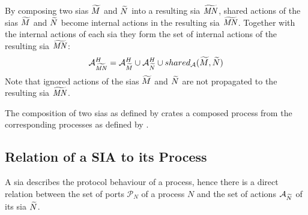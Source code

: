 By composing two \glspl{sia} $\widetilde{M}$ and $\widetilde{N}$ into a resulting \gls{sia} $\widetilde{\mathit{MN}}$, shared actions of the \glspl{sia} $\widetilde{M}$ and $\widetilde{N}$ become internal actions in the resulting \gls{sia} $\widetilde{\mathit{MN}}$.
Together with the internal actions of each \gls{sia} they form the set of internal actions of the resulting \gls{sia} $\widetilde{\mathit{MN}}$:
\begin{displaymath}
    \mathcal{A}_{\widetilde{\mathit{MN}}}^H = \mathcal{A}_{\widetilde{M}}^H \cup \mathcal{A}_{\widetilde{N}}^H \cup shared_\mathcal{A}(\widetilde{M},\widetilde{N})
\end{displaymath}
Note that ignored actions of the \glspl{sia} $\widetilde{M}$ and $\widetilde{N}$ are not propagated to the resulting \gls{sia} $\widetilde{\mathit{MN}}$.

The composition of two \glspl{sia} as defined by \Def{\ref{def_sia_comp}} crates a composed process from the corresponding processes as defined by \Def{\ref{def_proc_composed}}.

\subsection{Relation of a SIA to its Process}
\label{sect_sia_proc}
A \gls{sia} describes the protocol behaviour of a process, hence there is a direct relation between the set of ports $\mathcal{P}_N$ of a process $N$ and the set of actions $\mathcal{A}_{\widetilde{N}}$ of its \gls{sia} $\widetilde{N}$.

